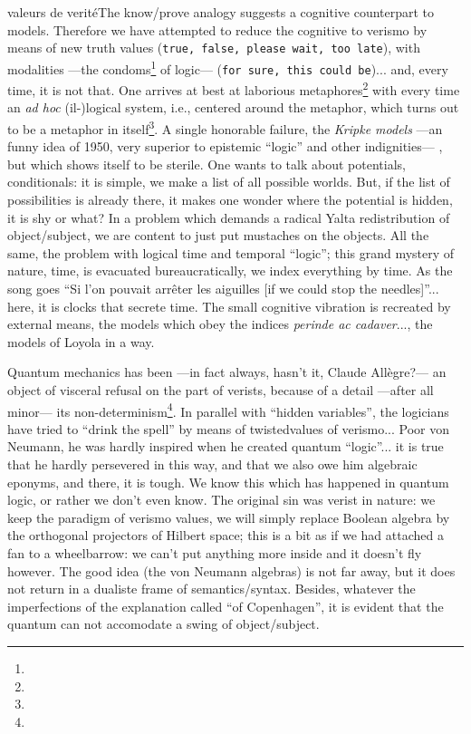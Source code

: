 \documentclass{article}
\begin{document}
valeurs de veritéThe know/prove analogy suggests a cognitive counterpart to models. Therefore we have attempted to reduce the cognitive to verismo by means of new truth values (\texttt{true, false, please wait, too late}), with modalities ---the condoms\footnote{} of logic--- (\texttt{for sure, this could be})... and, every time, it is not that. One arrives at best at laborious metaphores\footnote{} with every time an \emph{ad hoc} (il-)logical system, i.e., centered around the metaphor, which turns out to be a metaphor in itself\footnote{}. A single honorable failure, the \emph{Kripke models} ---an funny idea of 1950, very superior to epistemic \enquote{logic} and other indignities--- , but which shows itself to be sterile. One wants to talk about potentials, conditionals: it is simple, we make a list of all possible worlds. But, if the list of possibilities is already there, it makes one wonder where the potential is hidden, it is shy or what? In a problem which demands a radical Yalta redistribution of object/subject, we are content to just put mustaches on the objects. All the same, the problem with logical time and temporal \enquote{logic}; this grand mystery of nature, time, is evacuated bureaucratically, we index everything by time. As the song goes \enquote{Si l'on pouvait arrêter les aiguilles [if we could stop the needles]}... here, it is clocks that secrete time. The small cognitive vibration is recreated by external means, the models which obey the indices \emph{perinde ac cadaver}..., the models of Loyola in a way.

Quantum mechanics has been ---in fact always, hasn't it, Claude Allègre?--- an object of visceral refusal on the part of verists, because of a detail ---after all minor--- its non-determinism\footnote{}. In parallel with \enquote{hidden variables}, the logicians have tried to \enquote{drink the spell} by means of twistedvalues of verismo... Poor von Neumann, he was hardly inspired when he created quantum \enquote{logic}... it is true that he hardly persevered in this way, and that we also owe him algebraic eponyms, and there, it is tough. We know this which has happened in quantum logic, or rather we don't even know. The original sin was verist in nature: we keep the paradigm of verismo values, we will simply replace Boolean algebra by the orthogonal projectors of Hilbert space; this is a bit as if we had attached a fan to a wheelbarrow: we can't put anything more inside and it doesn't fly however. The good idea (the von Neumann algebras) is not far away, but it does not return in a dualiste frame of semantics/syntax. Besides, whatever the imperfections of the explanation called \enquote{of Copenhagen}, it is evident that the quantum can not accomodate a swing of object/subject.
\end{document}
